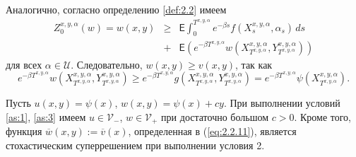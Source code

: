 Аналогично, согласно определению \ref{def:2.2} имеем
\begin{eqnarray*}
Z_0^{x,y,\alpha}(w)=w(x,y) &\ge &\mathsf E\int_0^{T^{x,y,\alpha}} e^{-\beta s} f(X^{x,y,\alpha}_s,\alpha_s)\,ds\\
 &+&\mathsf E\left(e^{-\beta T^{x,y,\alpha}} w(X^{x,y,\alpha}_{T^{x,y,\alpha}},Y^{x,y,\alpha}_{T^{x,y,\alpha}})\right)
\end{eqnarray*}
для всех $\alpha\in\mathcal U$. Следовательно, $w(x,y)\ge v(x,y)$, так как
$$e^{-\beta T^{x,y,\alpha}} w(X^{x,y,\alpha}_{T^{x,y,\alpha}},Y^{x,y,\alpha}_{T^{x,y,\alpha}})\ge e^{-\beta T^{x,y,\alpha}}g(X^{x,y,\alpha}_{T^{x,y,\alpha}},Y^{x,y,\alpha}_{T^{x,y,\alpha}})=e^{-\beta T^{x,y,\alpha}}\psi(X^{x,y,\alpha}_{T^{x,y,\alpha}}).$$

\begin{lemma} \label{lem:2.2}
Пусть $u(x,y)=\psi(x)$, $w(x,y)=\psi(x)+cy$. При выполнении условий \ref{as:1}, \ref{as:3} имеем $u\in\mathcal V_-$, $w\in\mathcal V_+$ при достаточно большом $c>0$. Кроме того, функция $\overline w(x,y):=\overline v(x)$, определенная в (\ref{eq:2.2.11}), является стохастическим суперрешением при выполнении условия 2.
\end{lemma}

